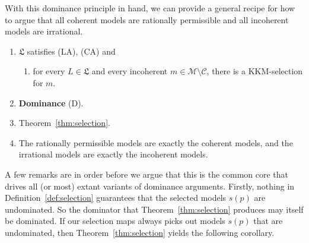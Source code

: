 \documentclass[11pt]{article}
\theoremstyle{definition}
\theoremstyle{remark}
\newcommand{\M}{\mathcal M}
\newcommand{\C}{\mathcal C}
\newcommand{\U}{\mathcal U}
\newcommand{\Lf}{\mathfrak L}
\begin{document}



With this dominance principle in hand, we can provide a general recipe for how to argue that all coherent models are rationally permissible and all incoherent models are irrational.
\begin{enumerate}[label=\textbf{(P\arabic*)},leftmargin=*]
\item $\Lf$ satisfies (LA), (CA) and
\begin{enumerate}
\item[(S)]\label{condition:selection} for every $L\in\Lf$ and every incoherent $m\in\M\setminus\C$, there is a KKM-selection for $m$.
\end{enumerate}
\item \textbf{Dominance} (D).
\item Theorem~\ref{thm:selection}.
\item[\textbf{(C)}]\label{conclusion:complete-class} The rationally permissible models are exactly the coherent models, and the irrational models are exactly the incoherent models.
\end{enumerate}



A few remarks are in order before we argue that this is the common core that drives all (or most) extant variants of dominance arguments. Firstly, nothing in Definition~\ref{def:selection} guarantees that the selected models $s(p)$ are undominated. So the dominator that Theorem~\ref{thm:selection} produces may itself be dominated. If our selection maps always picks out models $s(p)$ that are undominated, then Theorem~\ref{thm:selection} yields the following corollary.
\end{document}
